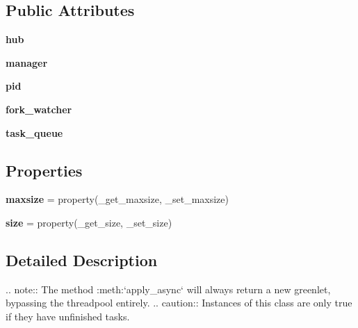 \subsection*{Public Attributes}
\begin{DoxyCompactItemize}
\item 
\mbox{\label{classgevent_1_1threadpool_1_1_thread_pool_acfd43301a0d7567dcba7dfe4a013e620}} 
{\bfseries hub}
\item 
\mbox{\label{classgevent_1_1threadpool_1_1_thread_pool_aba9199623ca3bf5901b8bb66bb262ca9}} 
{\bfseries manager}
\item 
\mbox{\label{classgevent_1_1threadpool_1_1_thread_pool_ac7eb46dea15360c80a7c1cec9f45bc42}} 
{\bfseries pid}
\item 
\mbox{\label{classgevent_1_1threadpool_1_1_thread_pool_a0249bdcb12d746dcf58e11dc7e1bed50}} 
{\bfseries fork\+\_\+watcher}
\item 
\mbox{\label{classgevent_1_1threadpool_1_1_thread_pool_abe27bfbefb6930585b958f397d896af9}} 
{\bfseries task\+\_\+queue}
\end{DoxyCompactItemize}
\subsection*{Properties}
\begin{DoxyCompactItemize}
\item 
\mbox{\label{classgevent_1_1threadpool_1_1_thread_pool_ad406081bc067382500a1f3723e9cc5cc}} 
{\bfseries maxsize} = property(\+\_\+get\+\_\+maxsize, \+\_\+set\+\_\+maxsize)
\item 
\mbox{\label{classgevent_1_1threadpool_1_1_thread_pool_af6363efbcb2e380d38422661c4842968}} 
{\bfseries size} = property(\+\_\+get\+\_\+size, \+\_\+set\+\_\+size)
\end{DoxyCompactItemize}


\subsection{Detailed Description}
\begin{DoxyVerb}.. note:: The method :meth:`apply_async` will always return a new
   greenlet, bypassing the threadpool entirely.
.. caution:: Instances of this class are only true if they have
   unfinished tasks.
\end{DoxyVerb}
 

